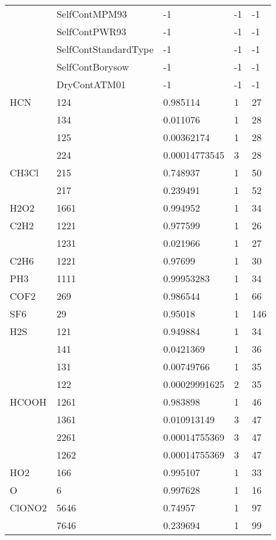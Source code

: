 \begin{longtable}{lllll}
    &SelfContMPM93&             -1      &-1     &-1\\
    &SelfContPWR93&             -1      &-1     &-1\\
    &SelfContStandardType&      -1      &-1     &-1\\
    &SelfContBorysow&           -1      &-1     &-1\\
    &DryContATM01&              -1      &-1     &-1\\
\hline                  
  HCN& 124&  0.985114&  1&27\\
     & 134&  0.011076&  1&28\\
     & 125&  0.00362174&  1&28\\
     & 224&  0.00014773545&  3&28\\
\hline                  
  CH3Cl& 215&  0.748937&  1&50\\
       & 217&  0.239491&  1&52\\
\hline                  
  H2O2& 1661&  0.994952&  1&34\\
\hline                  
  C2H2& 1221&  0.977599&  1&26\\
      & 1231&  0.021966&  1&27\\
\hline                  
  C2H6& 1221&  0.97699&  1&30\\
\hline
  PH3& 1111&  0.99953283&  1&34\\
\hline                  
  COF2& 269&  0.986544&  1&66\\
\hline                  
  SF6& 29&  0.95018&  1&146\\
\hline                  
  H2S& 121&  0.949884&  1&34\\
     & 141&  0.0421369&  1&36\\
     & 131&  0.00749766&  1&35\\
     & 122&  0.00029991625&  2&35\\
\hline                  
  HCOOH& 1261&  0.983898&  1&46\\
       & 1361&  0.010913149&  3&47\\
       & 2261&  0.00014755369&  3&47\\
       & 1262&  0.00014755369&  3&47\\
\hline                  
  HO2& 166&  0.995107&  1&33\\
\hline                  
  O& 6&  0.997628&  1&16\\
\hline                  
  ClONO2& 5646&  0.74957&  1&97\\
        & 7646&  0.239694&  1&99\\

\end{longtable}
